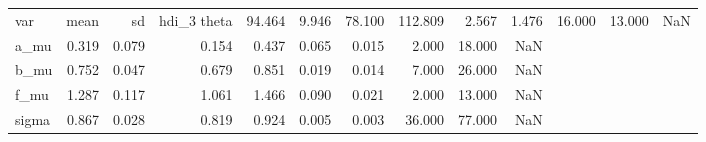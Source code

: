 \begin{tabular}{lrrrrrrrrr}
\toprule
var & mean & sd & hdi_3%
\midrule
theta & 94.464 & 9.946 & 78.100 & 112.809 & 2.567 & 1.476 & 16.000 & 13.000 & NaN \\
a_mu & 0.319 & 0.079 & 0.154 & 0.437 & 0.065 & 0.015 & 2.000 & 18.000 & NaN \\
b_mu & 0.752 & 0.047 & 0.679 & 0.851 & 0.019 & 0.014 & 7.000 & 26.000 & NaN \\
f_mu & 1.287 & 0.117 & 1.061 & 1.466 & 0.090 & 0.021 & 2.000 & 13.000 & NaN \\
sigma & 0.867 & 0.028 & 0.819 & 0.924 & 0.005 & 0.003 & 36.000 & 77.000 & NaN \\
\bottomrule
\end{tabular}
